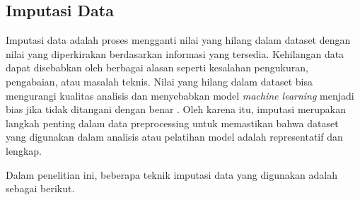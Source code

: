 \documentclass[conference]{IEEEtran}
\begin{document}
\subsection{Imputasi Data}
Imputasi data adalah proses mengganti nilai yang hilang dalam dataset dengan nilai yang diperkirakan berdasarkan informasi yang tersedia. 
Kehilangan data dapat disebabkan oleh berbagai alasan seperti kesalahan pengukuran, pengabaian, atau masalah teknis. Nilai yang hilang dalam dataset bisa mengurangi 
kualitas analisis dan menyebabkan model \textit{machine learning} menjadi bias jika tidak ditangani dengan benar \cite{b35}. Oleh karena itu, imputasi merupakan 
langkah penting dalam data preprocessing untuk memastikan bahwa dataset yang digunakan dalam analisis atau pelatihan model adalah representatif dan lengkap.

Dalam penelitian ini, beberapa teknik imputasi data yang digunakan adalah sebagai berikut.
\end{document}
